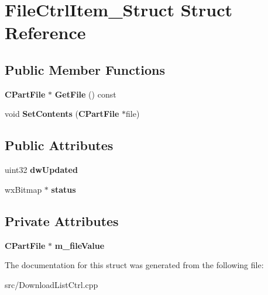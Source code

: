 \section{FileCtrlItem\_\-Struct Struct Reference}
\label{structFileCtrlItem__Struct}
\subsection*{Public Member Functions}
\begin{DoxyCompactItemize}
\item 
{\bf CPartFile} $\ast$ {\bfseries GetFile} () const \label{structFileCtrlItem__Struct_a7b314cdc55bddf33cfd8f0718b50ef4b}

\item 
void {\bfseries SetContents} ({\bf CPartFile} $\ast$file)\label{structFileCtrlItem__Struct_ade7f06b3615f200d79ebe436515601b8}

\end{DoxyCompactItemize}
\subsection*{Public Attributes}
\begin{DoxyCompactItemize}
\item 
uint32 {\bfseries dwUpdated}\label{structFileCtrlItem__Struct_a502713bbfa77ec3e89ca9ae90e682b7b}

\item 
wxBitmap $\ast$ {\bfseries status}\label{structFileCtrlItem__Struct_ab7fa719827fdca4a52b19e1200e8d772}

\end{DoxyCompactItemize}
\subsection*{Private Attributes}
\begin{DoxyCompactItemize}
\item 
{\bf CPartFile} $\ast$ {\bfseries m\_\-fileValue}\label{structFileCtrlItem__Struct_a9e014b22f9a22397c1360fececfa409b}

\end{DoxyCompactItemize}


The documentation for this struct was generated from the following file:\begin{DoxyCompactItemize}
\item 
src/DownloadListCtrl.cpp\end{DoxyCompactItemize}

